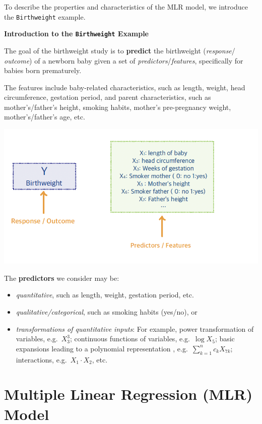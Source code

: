 \documentclass[
]{book}
\begin{document}
To describe the properties and characteristics of the MLR model, we introduce the \texttt{Birthweight} example.

\textbf{Introduction to the \texttt{Birthweight} Example}

The goal of the birthweight study is to \textbf{predict} the birthweight (\emph{response}/ \emph{outcome}) of a newborn baby given a set of \emph{predictors}/\emph{features}, specifically for babies born prematurely.

The features include baby-related characteristics, such as length, weight, head circumference, gestation period, and parent characteristics, such as mother's/father's height, smoking habits, mother's pre-pregnancy weight, mother's/father's age, etc.

\begin{center}\includegraphics[width=0.7\linewidth]{images/week2/birthweight1a} \end{center}

The \textbf{predictors} we consider may be:

\begin{itemize}
\item
  \emph{quantitative}, such as length, weight, gestation period, etc.
\item
  \emph{qualitative/categorical}, such as smoking habits (yes/no), or
\item
  \emph{transformations of quantitative inputs}: For example, power transformation of variables, e.g.~\(X_3^3\); continuous functions of variables, e.g.~\(\log X_5\); basic expansions leading to a polynomial representation , e.g.~\(\sum_{k=1}^{n} c_k X_{7k}\); interactions, e.g.~\(X_1\cdot X_2\), etc.
\end{itemize}

\section{Multiple Linear Regression (MLR) Model}\label{multiple-linear-regression-mlr-model}
\end{document}
